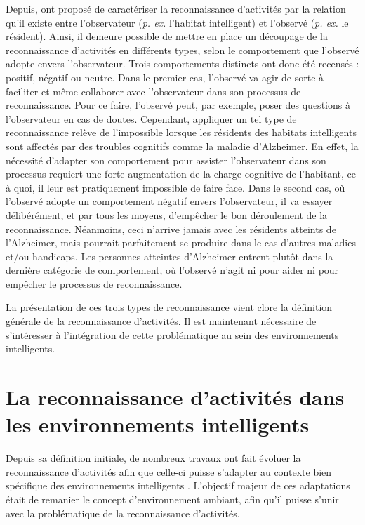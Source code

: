 {{Depuis, \cite{Roy2013} ont proposé de caractériser la reconnaissance d'activités par la relation qu'il existe entre l'observateur (\textit{p. ex.} l'habitat intelligent) et l'observé (\textit{p. ex.} le résident). Ainsi, il demeure possible de mettre en place un découpage de la reconnaissance d'activités en différents types, selon le comportement que l'observé adopte envers l'observateur. Trois comportements distincts ont donc été recensés : positif, négatif ou neutre. Dans le premier cas, l'observé va agir de sorte à faciliter et même collaborer avec l'observateur dans son processus de reconnaissance. Pour ce faire, l'observé peut, par exemple, poser des questions à l'observateur en cas de doutes. Cependant, appliquer un tel type de reconnaissance relève de l'impossible lorsque les résidents des habitats intelligents sont affectés par des troubles cognitifs comme la maladie d'Alzheimer. En effet, la nécessité d'adapter son comportement pour assister l'observateur dans son processus requiert une forte augmentation de la charge cognitive de l'habitant, ce à quoi, il leur est pratiquement impossible de faire face. Dans le second cas, où l'observé adopte un comportement négatif envers l'observateur, il va essayer délibérément, et par tous les moyens, d'empêcher le bon déroulement de la reconnaissance. Néanmoins, ceci n'arrive jamais avec les résidents atteints de l'Alzheimer, mais pourrait parfaitement se produire dans le cas d'autres maladies et/ou handicaps. Les personnes atteintes d'Alzheimer entrent plutôt dans la dernière catégorie de comportement, où l'observé n'agit ni pour aider ni pour empêcher le processus de reconnaissance.

La présentation de ces trois types de reconnaissance vient clore la définition générale de la reconnaissance d'activités. Il est maintenant nécessaire de s'intéresser à l'intégration de cette problématique au sein des environnements intelligents.

\section{La reconnaissance d'activités dans les environnements intelligents}

Depuis sa définition initiale, de nombreux travaux ont fait évoluer la reconnaissance d'activités afin que celle-ci puisse s'adapter au contexte bien spécifique des environnements intelligents \citep{Patterson2005, Boger2006, Bouchard2007, Ghayvat2018}. L'objectif majeur de ces adaptations était de remanier le concept d'environnement ambiant, afin qu'il puisse s'unir avec la problématique de la reconnaissance d'activités.

}}
